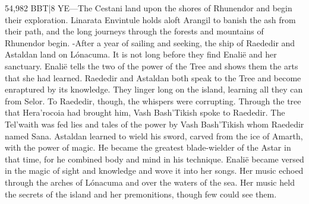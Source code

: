\documentclass[smalldemyvopaper,11pt,twoside,onecolumn,openright,extrafontsizes]{memoir}
\begin{document}
54,982 BBT|8 YE—The Cestani land upon the shores of Rhunendor and begin their exploration. Linarata Envintule holds aloft Arangil to banish the ash from their path, and the long journeys through the forests and mountains of Rhunendor begin.
-After a year of sailing and seeking, the ship of Raededir and Astaldan land on Lónacuma. It is not long before they find Enalië and her sanctuary. Enalië tells the two of the power of the Tree and shows them the arts that she had learned. Raededir and Astaldan both speak to the Tree and become enraptured by its knowledge. They linger long on the island, learning all they can from Selor. To Raededir, though, the whispers were corrupting. Through the tree that Hera’rocoia had brought him, Vash Bash’Tikish spoke to Raededir. The Tel’waith was fed lies and tales of the power by Vash Bash’Tikish whom Raededir named Sana. Astaldan learned to wield his sword, carved from the ice of Amarth, with the power of magic. He became the greatest blade-wielder of the Astar in that time, for he combined body and mind in his technique. Enalië became versed in the magic of sight and knowledge and wove it into her songs. Her music echoed through the arches of Lónacuma and over the waters of the sea. Her music held the secrets of the island and her premonitions, though few could see them.
\end{document}
